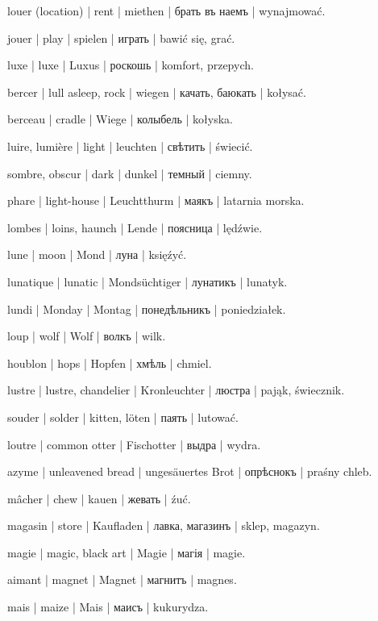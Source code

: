 \begin{outdent}{1em}
louer (location) | rent | miethen | брать въ наемъ | wynajmować.

jouer | play | spielen | играть | bawić się, grać.

luxe | luxe | Luxus | роскошь | komfort, przepych.

bercer | lull asleep, rock | wiegen | качать, баюкать | kołysać.

\uvsubentry{}
berceau | cradle | Wiege | колыбель | kołyska.

luire, lumière | light | leuchten | свѣтить | świecić.

\uvsubentry{}
sombre, obscur | dark | dunkel | темный | ciemny.


\uvsubentry{}
phare | light-house | Leuchtthurm | маякъ | latarnia morska.

lombes | loins, haunch | Lende | поясница | lędźwie.

lune | moon | Mond | луна | księźyć.

lunatique | lunatic | Mondsüchtiger | лунатикъ | lunatyk.

lundi | Monday | Montag | понедѣльникъ | poniedziałek.

loup | wolf | Wolf | волкъ | wilk.

houblon | hops | Hopfen | хмѣль | chmiel.

lustre | lustre, chandelier | Kronleuchter | люстра | pająk,
świecznik.

souder | solder | kitten, löten | паять | lutować.

loutre | common otter | Fischotter | выдра | wydra.


azyme | unleavened bread | ungesäuertes Brot | опрѣснокъ | praśny chleb.

mâcher | chew | kauen | жевать | źuć.

magasin | store | Kaufladen | лавка, магазинъ | sklep,
magazyn.

magie | magic, black art | Magie | магія | magie.

aimant | magnet | Magnet | магнитъ | magnes.

mais | maize | Mais | маисъ | kukurydza.


\end{outdent}
